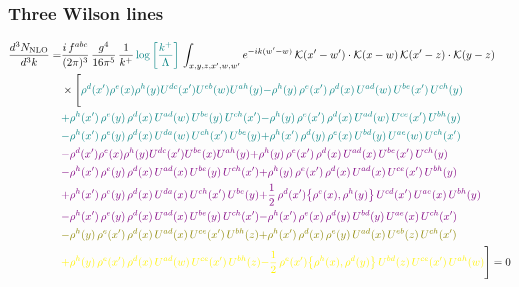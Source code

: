 \documentclass[9pt]{article}
\numberwithin{equation}{section}
\begin{document}
\subsubsection{Three Wilson lines}
\begin{align}
    \frac{d^{3}N_{\rm NLO}}{d^{3}k}= & \frac{i\,f^{abc}}{(2\pi)^{3}}\,\frac{g^{4}}{16\pi^{5}}\,\frac{1}{k^{+}}\,{\color{teal}\log{\left[\frac{k^{+}}{\Lambda}\right]}}\,\int_{x,y,z,x',w,w'}e^{-ik(w'-w)}\,\mathcal{K}(x'-w')\cdot\mathcal{K}(x-w)\,\mathcal{K}(x'-z)\cdot\mathcal{K}(y-z)\notag \\ & \times\Bigg[{\color{teal}\rho^{d}(x') \rho^{e}(x) \rho^{h}(y) U^{d c}(x') U^{e b}(w) U^{a h}(y)}{\color{teal}-\rho^{h}(y)\,\rho^{e}(x')\,\rho^{d}(x)\,U^{ad}(w)\,U^{be}(x')\,U^{ch}(y)}\notag \\
&{\color{teal}+\rho^{h}(x')\,\rho^{e}(y)\,\rho^{d}(x)\,U^{ad}(w)\,U^{be}(y)\,U^{ch}(x')}{\color{teal}-\rho^{h}(y)\,\rho^{e}(x')\,\rho^{d}(x)\,U^{ad}(w)\,U^{ce}(x')\,U^{bh}(y)} \notag \\ &{\color{teal}-\rho^{h}(x')\,\rho^{e}(y)\,\rho^{d}(x)\,U^{da}(w)\,U^{ch}(x')\,U^{be}(y)}{\color{teal}+\rho^{h}(x')\,\rho^{d}(y)\,\rho^{e}(x)\,U^{bd}(y)\,U^{ae}(w)\,U^{ch}(x')}\notag \\
&{\color{violet}-\rho^{d}(x') \rho^{e}(x) \rho^{h}(y) U^{d c}(x') U^{b e}(x) U^{a h}(y)}{\color{violet}+\rho^{h}(y)\,\rho^{e}(x')\,\rho^{d}(x)\,U^{ad}(x)\,U^{be}(x')\,U^{ch}(y)}\notag \\ & {\color{violet}-\rho^{h}(x')\,\rho^{e}(y)\,\rho^{d}(x)\,U^{ad}(x)\,U^{be}(y)\,U^{ch}(x')} {\color{violet}+\rho^{h}(y)\,\rho^{e}(x')\,\rho^{d}(x)\,U^{ad}(x)\,U^{ce}(x')\,U^{bh}(y)}\notag \\ & {\color{violet}+\rho^{h}(x')\,\rho^{e}(y)\,\rho^{d}(x)\,U^{da}(x)\,U^{ch}(x')\,U^{be}(y)}{\color{violet}+\frac{1}{2}\,\rho^{d}(x')\big\{\rho^{e}(x),\rho^{h}(y)\big\}\,U^{cd}(x')\,U^{ae}(x)\,U^{bh}(y)}\notag \\ & {\color{violet}-\rho^{h}(x')\,\rho^{e}(y)\,\rho^{d}(x)\,U^{ad}(x)\,U^{be}(y)\,U^{ch}(x')}{\color{violet}-\rho^{h}(x')\,\rho^{e}(x)\,\rho^{d}(y)\,U^{bd}(y)\,U^{ae}(x)\,U^{ch}(x')}\notag \\ & {\color{olive}-\rho^{h}(y)\,\rho^{e}(x')\,\rho^{d}(x)\,U^{ad}(x)\,U^{ce}(x')\,U^{bh}(z)}{\color{olive}+\rho^{h}(x')\,\rho^{d}(x)\,\rho^{e}(y)\,U^{ad}(x)\,U^{eb}(z)\,U^{ch}(x')}\notag \\ & {\color{yellow}+\rho^{h}(y)\,\rho^{e}(x')\,\rho^{d}(x)\,U^{ad}(w)\,U^{ce}(x')\,U^{bh}(z)}{\color{yellow}-\frac{1}{2}\,\rho^{e}(x')\big\{\rho^{h}(x),\rho^{d}(y)\big\}\,U^{bd}(z)\,U^{ce}(x')\,U^{ah}(w)}\Bigg] = 0
\end{align}
\end{document}
